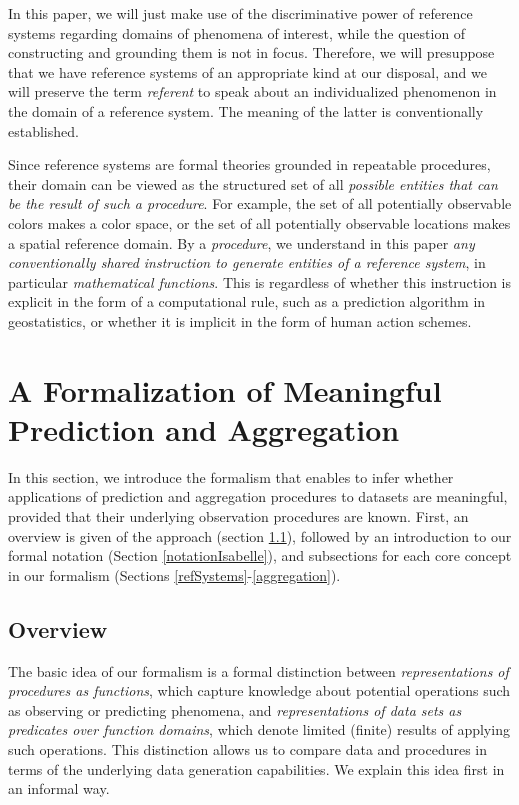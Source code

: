 \documentclass[final,authoryear,1p,times]{elsarticle}
\begin{document}
In this paper, we will just make use of the discriminative power of reference systems regarding domains of phenomena of interest, while the question of constructing and grounding them is not in focus. Therefore, we will presuppose that we have reference systems of an appropriate kind at our disposal, and we will preserve the term \textit{referent} to speak about an individualized phenomenon in the domain of a reference system. The meaning of the latter is conventionally established.

Since reference systems are formal theories grounded in repeatable procedures, their domain can be viewed as the structured set of all \textit{possible entities that can be the result of such a procedure}. For example, the set of all potentially observable colors makes a color space, or the set of all potentially observable locations makes a spatial reference domain. By a \textit{procedure}, we understand in this paper \textit{any conventionally shared instruction to generate %
entities of a reference system}, in particular \textit{mathematical functions}. This is regardless of whether this instruction is explicit in the form of a computational rule, such as a prediction algorithm in geostatistics, or whether it is implicit in the form of human action schemes.

\section{A Formalization of Meaningful Prediction and Aggregation} 
\label{approach}

In this section, we introduce the formalism that enables to infer whether applications of prediction and aggregation procedures to datasets are meaningful, provided that their underlying observation procedures are known. First, an overview is given of the approach (section \ref{formOverview}), followed by an introduction to our formal notation (Section \ref{notationIsabelle}), and subsections for each core concept in our formalism (Sections \ref{refSystems}-\ref{aggregation}).

\subsection{Overview}
\label{formOverview}
The basic idea of our formalism is a formal distinction between \textit{representations of procedures as functions}, which capture knowledge about potential operations such as observing or predicting phenomena, and \textit{representations of data sets as predicates over function domains}, which denote limited (finite) results of applying such operations. This distinction allows us to compare data and procedures in terms of the underlying data generation capabilities. We explain this idea first in an informal way.
 
\end{document}
